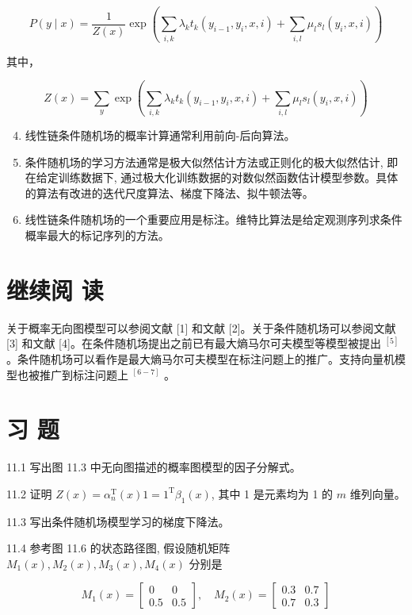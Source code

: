 \documentclass[10pt]{article}
\begin{document}
\begin{CJK*}{UTF8}{bsmi}
\begin{enumerate}
\end{enumerate}

$$
P(y \mid x)=\frac{1}{Z(x)} \exp \left(\sum_{i, k} \lambda_{k} t_{k}\left(y_{i-1}, y_{i}, x, i\right)+\sum_{i, l} \mu_{l} s_{l}\left(y_{i}, x, i\right)\right)
$$

其中，

$$
Z(x)=\sum_{y} \exp \left(\sum_{i, k} \lambda_{k} t_{k}\left(y_{i-1}, y_{i}, x, i\right)+\sum_{i, l} \mu_{l} s_{l}\left(y_{i}, x, i\right)\right)
$$

\begin{enumerate}
  \setcounter{enumi}{3}
  \item 线性链条件随机场的概率计算通常利用前向-后向算法。

  \item 条件随机场的学习方法通常是极大似然估计方法或正则化的极大似然估计, 即在给定训练数据下, 通过极大化训练数据的对数似然函数估计模型参数。具体的算法有改进的迭代尺度算法、梯度下降法、拟牛顿法等。

  \item 线性链条件随机场的一个重要应用是标注。维特比算法是给定观测序列求条件概率最大的标记序列的方法。

\end{enumerate}

\section*{继续阅 读}
关于概率无向图模型可以参阅文献 [1] 和文献 [2]。关于条件随机场可以参阅文献 [3] 和文献 [4]。在条件随机场提出之前已有最大熵马尔可夫模型等模型被提出 ${ }^{[5]}$ 。条件随机场可以看作是最大熵马尔可夫模型在标注问题上的推广。支持向量机模型也被推广到标注问题上 ${ }^{[6-7]}$ 。

\section*{习 题}
11.1 写出图 11.3 中无向图描述的概率图模型的因子分解式。

11.2 证明 $Z(x)=\alpha_{n}^{\mathrm{T}}(x) 1=1^{\mathrm{T}} \beta_{1}(x)$, 其中 1 是元素均为 1 的 $m$ 维列向量。

11.3 写出条件随机场模型学习的梯度下降法。

11.4 参考图 11.6 的状态路径图, 假设随机矩阵 $M_{1}(x), M_{2}(x), M_{3}(x), M_{4}(x)$ 分别是

$$
M_{1}(x)=\left[\begin{array}{cc}
0 & 0 \\
0.5 & 0.5
\end{array}\right], \quad M_{2}(x)=\left[\begin{array}{cc}
0.3 & 0.7 \\
0.7 & 0.3
\end{array}\right]
$$


\end{CJK*}
\end{document}
